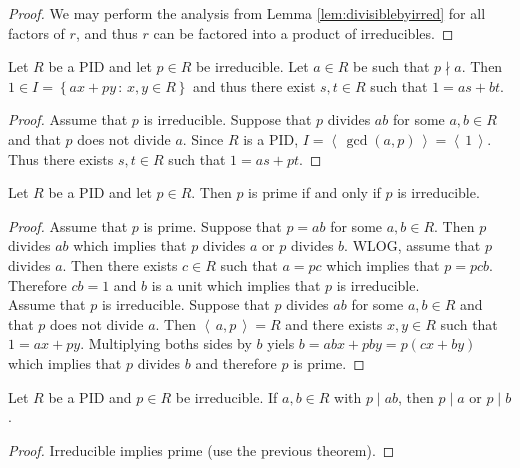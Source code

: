 \documentclass[english,course]{lecture}
\newcommand{\ideal}[1]{\left\langle\, #1 \,\right\rangle}
\theoremstyle{plain}
\def\setof#1#2{{\left\{#1\,\colon\,#2\right\}}}
\def\presnotes{}
\begin{document}
\begin{proof}
	We may perform the analysis from Lemma \ref{lem:divisiblebyirred} for all factors of $r$, and thus $r$ can be factored into a product of irreducibles.
\end{proof}

\presnotes

\begin{lemma}
	Let $R$ be a PID and let $p\in R$ be irreducible.
	Let $a\in R$ be such that $p\nmid a$.
	Then $1\in I = \setof{ax+py}{x,y\in R}$ and thus there exist $s,t\in R$ such that $1 = as+bt$.
\end{lemma}

\begin{proof}
Assume that $p$ is irreducible. Suppose that $p$ divides $ab$ for some $a,b \in R$ and that $p$ does not divide $a$. Since $R$ is a PID, $I = \ideal{\gcd(a,p)} = \ideal{1}$. Thus there exists $s,t\in R$ such that $1=as+pt$.
\end{proof}

\presnotes 

\begin{theorem}
	Let $R$ be a PID and let $p\in R$.
	Then $p$ is prime if and only if $p$ is irreducible.
\end{theorem}

\begin{proof}
	Assume that $p$ is prime. Suppose that $p=ab$ for some $a,b \in R$. Then $p$ divides $ab$ which implies that $p$ divides $a$ or $p$ divides $b$. WLOG, assume that $p$ divides $a$. Then there exists $c\in R$ such that $a=pc$ which implies that $p=pcb$. Therefore $cb=1$ and $b$ is a unit which implies that $p$ is irreducible.\\
	
	Assume that $p$ is irreducible. Suppose that $p$ divides $ab$ for some $a,b \in R$ and that $p$ does not divide $a$. Then $\ideal{a,p}=R$ and there exists $x,y\in R$ such that $1=ax+py$. Multiplying boths sides by $b$ yiels $b=abx+pby=p(cx+by)$ which implies that $p$ divides $b$ and therefore $p$ is prime. 
\end{proof}

\presnotes

\begin{theorem}
	Let $R$ be a PID and $p\in R$ be irreducible.
	If $a,b\in R$ with $p\mid ab$, then $p\mid a$ or $p\mid b$.
\end{theorem}

\begin{proof}
	Irreducible implies prime (use the previous theorem).
\end{proof}
\end{document}
